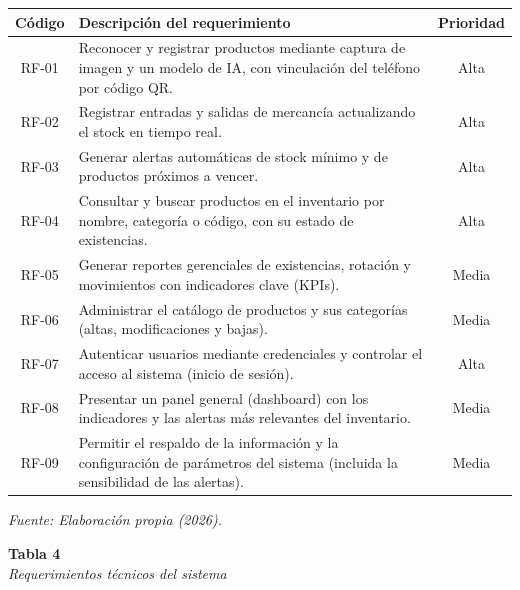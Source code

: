 \documentclass[12pt, letterpaper]{report}
\begin{document}
\begin{center}
\begin{tabular}{|c|>{\raggedright\arraybackslash}p{8.5cm}|c|}
\hline
\textbf{Código} & \textbf{Descripción del requerimiento} &
\textbf{Prioridad} \\
\hline
RF-01 & Reconocer y registrar productos mediante captura de imagen y
un modelo de IA, con vinculación del teléfono por código QR. & Alta \\
\hline
RF-02 & Registrar entradas y salidas de mercancía actualizando el
stock en tiempo real. & Alta \\
\hline
RF-03 & Generar alertas automáticas de stock mínimo y de productos
próximos a vencer. & Alta \\
\hline
RF-04 & Consultar y buscar productos en el inventario por nombre,
categoría o código, con su estado de existencias. & Alta \\
\hline
RF-05 & Generar reportes gerenciales de existencias, rotación y
movimientos con indicadores clave (KPIs). & Media \\
\hline
RF-06 & Administrar el catálogo de productos y sus categorías
(altas, modificaciones y bajas). & Media \\
\hline
RF-07 & Autenticar usuarios mediante credenciales y controlar el
acceso al sistema (inicio de sesión). & Alta \\
\hline
RF-08 & Presentar un panel general (dashboard) con los indicadores y
las alertas más relevantes del inventario. & Media \\
\hline
RF-09 & Permitir el respaldo de la información y la configuración de
parámetros del sistema (incluida la sensibilidad de las alertas). &
Media \\
\hline
\end{tabular}
\end{center}
\vspace{2pt}
\noindent\small\textit{Fuente: Elaboración propia (2026).}\normalsize
{}

\vspace{6pt}

%
\noindent\textbf{Tabla 4}\\
\textit{Requerimientos técnicos del sistema}
\vspace{4pt}
\end{document}
